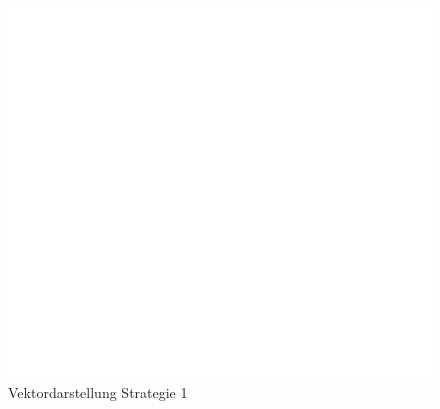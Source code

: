 \begin{figure}
    \centering
	\includegraphics[scale=0.1]{./papers/lambertw/Bilder/pursuerDGL2.pdf}
    \caption{Vektordarstellung Strategie 1}
    \label{lambertw:grafic:pursuerDGL2}
\end{figure}


